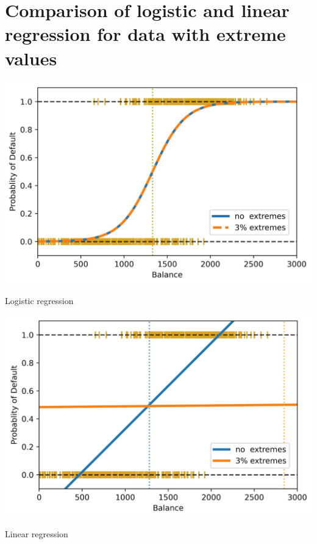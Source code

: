 \documentclass[10pt]{article}
\begin{document}
\section*{Comparison of logistic and linear regression for data with extreme values}
\begin{center}
\includegraphics[max width=\textwidth]{2023_12_30_261a5c67f471a6c49904g-08}
\end{center}

Logistic regression

\begin{center}
\includegraphics[max width=\textwidth]{2023_12_30_261a5c67f471a6c49904g-08(1)}
\end{center}

Linear regression
\end{document}
